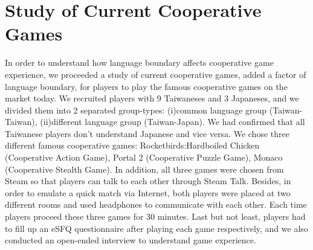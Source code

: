 \section{Study of Current Cooperative Games}


In order to understand how language boundary affects cooperative game experience, we proceeded a study of current cooperative games, added a factor of language boundary, for players to play the famous cooperative games on the market today. We recruited players with 9 Taiwaneses and 3 Japaneses, and we divided them into 2 separated group-types: (i)common language group (Taiwan-Taiwan), (ii)different language group (Taiwan-Japan). We had confirmed that all Taiwanese players don't understand Japanese and vice versa. We chose three different famous cooperative games: Rocketbirds:Hardboiled Chicken (Cooperative Action Game), Portal 2 (Cooperative Puzzle Game), Monaco (Cooperative Stealth Game). In addition, all three games were chosen from Steam\cite{PS1} so that players can talk to each other through Steam Talk. Besides, in order to emulate a quick match via Internet, both players were placed at two different rooms and used headphones to communicate with each other. Each time players proceed these three games for 30 minutes. Last but not least, players had to fill up an eSFQ\cite{eSFQ} questionnaire after playing each game respectively, and we also conducted an open-ended interview to understand game experience. 

